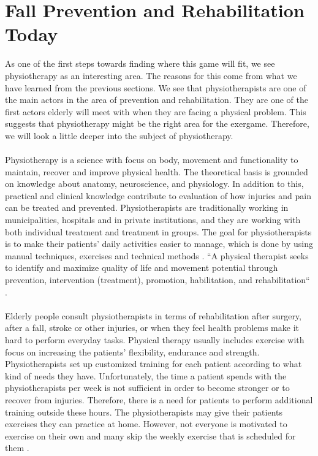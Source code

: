\section{Fall Prevention and Rehabilitation Today}
As one of the first steps towards finding where this game will fit, we see physiotherapy as an interesting area. The reasons for this come from what we have learned from the previous sections. We see that physiotherapists are one of the main actors in the area of prevention and rehabilitation. They are one of the first actors elderly will meet with when they are facing a physical problem. This suggests that physiotherapy might be the right area for the exergame. Therefore, we will look a little deeper into the subject of physiotherapy. \\ \\
Physiotherapy is a science with focus on body, movement and functionality to maintain, recover and improve physical health. The theoretical basis is grounded on knowledge about anatomy, neuroscience, and physiology. In addition to this, practical and clinical knowledge contribute to evaluation of how injuries and pain can be treated and prevented. Physiotherapists are traditionally working in municipalities, hospitals and in private institutions, and they are working with both individual treatment and treatment in groups. The goal for physiotherapists is to make their patients' daily activities easier to manage, which is done by using manual techniques, exercises and technical methods \cite{physiotherapy1}\cite{physiotherapy2}. “A physical therapist seeks to identify and maximize quality of life and movement potential through prevention, intervention (treatment), promotion, habilitation, and rehabilitation“ \cite{physiocite}. \\ \\
Elderly people consult physiotherapists in terms of rehabilitation after surgery, after a fall, stroke or other injuries, or when they feel health problems make it hard to perform everyday tasks. Physical therapy usually includes exercise with focus on increasing the patients’ flexibility, endurance and strength. Physiotherapists set up customized training for each patient according to what kind of needs they have. Unfortunately, the time a patient spends with the physiotherapists per week is not sufficient in order to become stronger or to recover from injuries. Therefore, there is a need for patients to perform additional training outside these hours. The physiotherapists may give their patients exercises they can practice at home. However, not everyone is motivated to exercise on their own and many skip the weekly exercise that is scheduled for them \cite{physiotherapy2}. 


